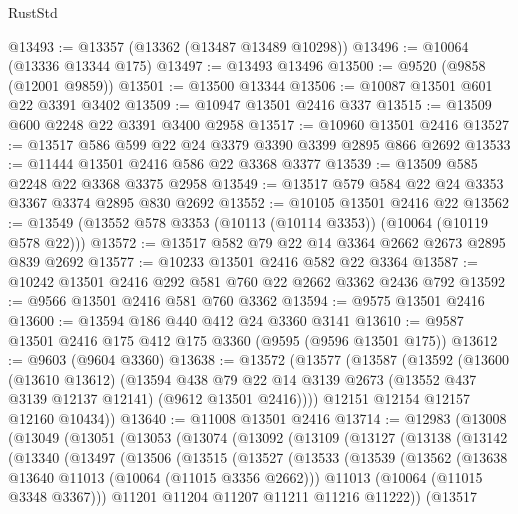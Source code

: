 \begin{lexlean}{RustStd}
\begin{coremodule}
@13493 := @13357 (@13362 (@13487 @13489 @10298))
@13496 := @10064 (@13336 @13344 @175)
@13497 := @13493 @13496
@13500 := @9520 (@9858 (@12001 @9859))
@13501 := @13500 @13344
@13506 := @10087 @13501 @601 @22 @3391 @3402
@13509 := @10947 @13501 @2416 @337
@13515 := @13509 @600 @2248 @22 @3391 @3400 @2958
@13517 := @10960 @13501 @2416
@13527 := @13517 @586 @599 @22 @24 @3379 @3390 @3399 @2895 @866 @2692
@13533 := @11444 @13501 @2416 @586 @22 @3368 @3377
@13539 := @13509 @585 @2248 @22 @3368 @3375 @2958
@13549 := @13517 @579 @584 @22 @24 @3353 @3367 @3374 @2895 @830 @2692
@13552 := @10105 @13501 @2416 @22
@13562 := @13549 (@13552 @578 @3353 (@10113 (@10114 @3353)) (@10064 (@10119 @578 @22)))
@13572 := @13517 @582 @79 @22 @14 @3364 @2662 @2673 @2895 @839 @2692
@13577 := @10233 @13501 @2416 @582 @22 @3364
@13587 := @10242 @13501 @2416 @292 @581 @760 @22 @2662 @3362 @2436 @792
@13592 := @9566 @13501 @2416 @581 @760 @3362
@13594 := @9575 @13501 @2416
@13600 := @13594 @186 @440 @412 @24 @3360 @3141
@13610 := @9587 @13501 @2416 @175 @412 @175 @3360 (@9595 (@9596 @13501 @175))
@13612 := @9603 (@9604 @3360)
@13638 := @13572
    (@13577
      (@13587
        (@13592
          (@13600
            (@13610 @13612)
            (@13594
              @438
              @79
              @22
              @14
              @3139
              @2673
              (@13552 @437 @3139 @12137 @12141)
              (@9612 @13501 @2416))))
        @12151
        @12154
        @12157
        @12160
        @10434))
@13640 := @11008 @13501 @2416
@13714 := @12983
    (@13008
      (@13049
        (@13051
          (@13053
            (@13074
              (@13092
                (@13109
                  (@13127
                    (@13138
                      (@13142
                        (@13340
                          (@13497
                            (@13506
                              (@13515
                                (@13527
                                  (@13533
                                    (@13539
                                      (@13562
                                        (@13638 @13640 @11013 (@10064 (@11015 @3356 @2662)))
                                        @11013
                                        (@10064 (@11015 @3348 @3367)))
                                      @11201
                                      @11204
                                      @11207
                                      @11211
                                      @11216
                                      @11222))
                                  (@13517

\end{coremodule}
\end{lexlean}
